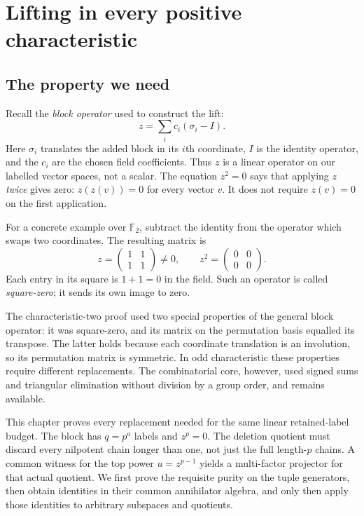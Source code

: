 \chapter{Lifting in every positive characteristic}\label{tx:sec:odd}
\label{tx:ch:prime}
\section*{The property we need}
Recall the \emph{block operator} used to construct the lift:
\[
                       z=\sum_i c_i(\sigma_i-I).
\]
Here $\sigma_i$ translates the added block in its $i$th coordinate,
$I$ is the identity operator, and the $c_i$ are the chosen field
coefficients. Thus $z$ is a linear operator on our labelled vector
spaces, not a scalar. The equation $z^2=0$ says that applying $z$
\emph{twice} gives zero: $z(z(v))=0$ for every vector $v$. It does
not require $z(v)=0$ on the first application.

For a concrete example over $\mathbb F_2$, subtract the identity
from the operator which swaps two coordinates. The resulting matrix is
\[
 z=\begin{pmatrix}1&1\\1&1\end{pmatrix}\ne0,
 \qquad z^2=\begin{pmatrix}0&0\\0&0\end{pmatrix}.
\]
Each entry in its square is $1+1=0$ in the field. Such an operator is
called \emph{square-zero}; it sends its own image to zero.

The characteristic-two proof used two special properties of the
general block operator: it was square-zero, and its matrix on the
permutation basis equalled its transpose. The latter holds because
each coordinate translation is an involution, so its permutation
matrix is symmetric. In odd characteristic these properties require
different replacements. The combinatorial core, however, used signed
sums and triangular elimination without division by a group order,
and remains available.

This chapter proves every replacement needed for the same linear
retained-label budget. The block has $q=p^a$ labels and $z^p=0$.
The deletion quotient must discard every nilpotent chain longer than
one, not just the full length-$p$ chains. A common witness for the
top power $u=z^{p-1}$ yields a multi-factor projector for that actual
quotient. We first prove the requisite purity on the tuple generators,
then obtain identities in their common annihilator algebra, and only
then apply those identities to arbitrary subspaces and quotients.


